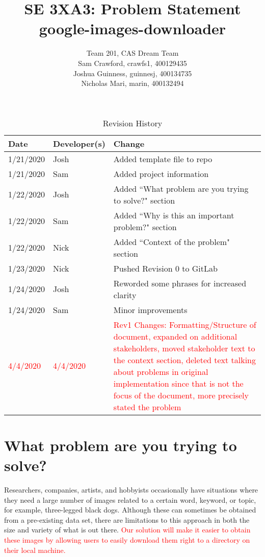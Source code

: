 \documentclass{article}
\title{SE 3XA3: Problem Statement\\google-images-downloader}
\author{Team 201, CAS Dream Team
		\\ Sam Crawford, crawfs1, 400129435
		\\ Joshua Guinness, guinnesj, 400134735
		\\ Nicholas Mari, marin, 400132494
}
\date{}
\begin{document}
\maketitle

\begin{table}
	\caption{Revision History} \label{TblRevisionHistory}
	\begin{tabularx}{\textwidth}{llX}
	\toprule
	\textbf{Date} & \textbf{Developer(s)} & \textbf{Change}\\
	\midrule
	1/21/2020 & Josh & Added template file to repo\\
	1/21/2020 & Sam  & Added project information\\
	1/22/2020 & Josh & Added ``What problem are you trying to solve?" section\\
	1/22/2020 & Sam  & Added ``Why is this an important problem?" section\\
	1/22/2020 & Nick & Added ``Context of the problem" section\\
	1/23/2020 & Nick & Pushed Revision 0 to GitLab\\
	1/24/2020 & Josh & Reworded some phrases for increased clarity\\
	1/24/2020 & Sam  & Minor improvements\\
	\textcolor{red}{4/4/2020} & \textcolor{red}{4/4/2020} & 
	\textcolor{red}{Rev1 Changes: Formatting/Structure of document,
	expanded on additional stakeholders, 
	moved stakeholder text to the context section,
	deleted text talking about problems in original implementation
	since that is not the focus of the document, more precisely stated the problem}\\
	\bottomrule
	\end{tabularx}
\end{table}

\newpage

\section* {What problem are you trying to solve?}

Researchers, companies, artists, and hobbyists occasionally have situations where they need a large number of 
images related to a certain word, keyword, or topic, for example, three-legged black dogs. Although these can 
sometimes be obtained from a pre-existing data set, there are limitations to this approach in both the size 
and variety of what is out there. \textcolor{red}{Our solution will make it easier to obtain these images by
allowing users to easily download them right to a directory on their local machine.}
\end{document}
